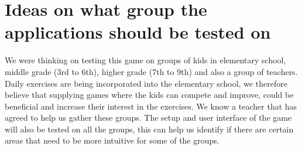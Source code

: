 \documentclass[12pt]{report}
\begin{document}
\section*{Ideas on what group the applications should be tested on}
We were thinking on testing this game on groups of kids in elementary school, middle grade (3rd to 6th), higher grade (7th to 9th) and also a group of teachers. Daily exercises are being incorporated into the elementary school, we therefore believe that supplying games where the kids can compete and improve, could be beneficial and increase their interest in the exercises. We know a teacher that has agreed to help us gather these groups. The setup and user interface of the game will also be tested on all the groups, this can help us identify if there are certain areas that need to be more intuitive for some of the groups.
\end{document}
